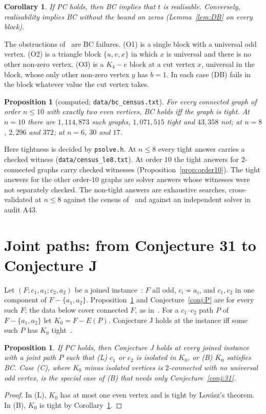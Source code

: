 \documentclass[11pt]{amsart}
\newtheorem{proposition}[theorem]{Proposition}
\newtheorem{corollary}[theorem]{Corollary}
\theoremstyle{definition}
\begin{document}
\begin{corollary}\label{cor:BC}
If PC holds, then BC implies that $t$ is realisable. Conversely, realisability implies BC without the
bound on zeros (Lemma~\ref{lem:DB} on every block).
\end{corollary}

The obstructions of~\cite[Proposition~47]{EP} are BC failures. (O1) is a single block with a universal odd vertex.
(O2) is a triangle block $\{u,v,x\}$ in which $x$ is universal and there is no other non-zero vertex.
(O3) is a $K_4-e$ block at a cut vertex $x$, universal in the block, whose only other non-zero vertex $y$
has $b=1$. In each case (DB) fails in the block whatever value the cut vertex takes.

\begin{proposition}[computed; \texttt{data/bc\_census.txt}]\label{prop:BCcensus}
For every connected graph of order $n\le10$ with exactly two even vertices, BC holds iff the graph is
tight. At $n=10$ there are $1{,}114{,}873$ such graphs, $1{,}071{,}515$ tight and $43{,}358$ not; at $n=8$,
$2{,}296$ and $372$; at $n=6$, $30$ and $17$.
\end{proposition}

Here tightness is decided by \texttt{psolve.h}. At $n\le8$ every tight answer carries a checked witness
(\texttt{data/census\_le8.txt}). At order $10$ the tight answers for $2$-connected graphs carry checked
witnesses (Proposition~\ref{prop:order10}). The tight answers for the other order-$10$ graphs are solver
answers whose witnesses were not separately checked. The non-tight answers are exhaustive searches,
cross-validated at $n\le8$ against the census of~\cite{EP} and against an independent solver in audit A43.

\section{Joint paths: from Conjecture 31 to Conjecture J}\label{sec:J}

Let $(F;c_1,a_1;c_2,a_2)$ be a joined instance~\cite{CR}: $F$ all odd, $c_i\not\sim a_i$, and $c_1,c_2$ in
one component of $F-\{a_1,a_2\}$. Proposition~\ref{prop:J} and Conjecture~\ref{conj:P} are for every such
$F$; the data below cover connected $F$, as in~\cite{CR}. For a $c_1$--$c_2$ path $P$ of $F-\{a_1,a_2\}$ let
$K_0=F-E(P)$. Conjecture J holds at the instance iff some such $P$ has $K_0$ tight~\cite[\S5]{CR}.

\begin{proposition}\label{prop:J}
If PC holds, then Conjecture J holds at every joined instance with a joint path $P$ such that
\textup{(L)} $c_1$ or $c_2$ is isolated in $K_0$, or \textup{(B)} $K_0$ satisfies BC. Case \textup{(C)},
where $K_0$ minus isolated vertices is $2$-connected with no universal odd vertex, is the special case of
\textup{(B)} that needs only Conjecture~\ref{conj:31}.
\end{proposition}
\begin{proof}
In (L), $K_0$ has at most one even vertex and is tight by Lov\'asz's theorem. In (B), $K_0$ is tight by
Corollary~\ref{cor:BC}.
\end{proof}
\end{document}

